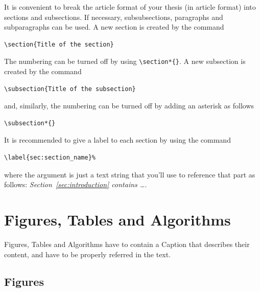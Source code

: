 \documentclass[11pt,a4paper]{article}
\begin{document}
It is convenient to break the article format of your thesis (in article format) into sections and subsections. 
If necessary, subsubsections, paragraphs and subparagraphs can be used. 
A new section is created by the command
\begin{verbatim}
\section{Title of the section}
\end{verbatim}
The numbering can be turned off by using \verb|\section*{}|.
A new subsection is created by the command
\begin{verbatim}
\subsection{Title of the subsection}
\end{verbatim}
and, similarly, the numbering can be turned off by adding an asterisk as follows 
\begin{verbatim}
\subsection*{}
\end{verbatim}
It is recommended to give a label to each section by using the command
\begin{verbatim}
\label{sec:section_name}%
\end{verbatim}
where the argument is just a text string that you'll use to reference that part
as follows: \textit{Section~\ref{sec:introduction} contains   \dots}.

\section{Figures, Tables and Algorithms}

Figures, Tables and Algorithms have to contain a Caption that describes their content, and have to be properly referred in the text.

\subsection{Figures}
\label{subsec:figures}
\end{document}
